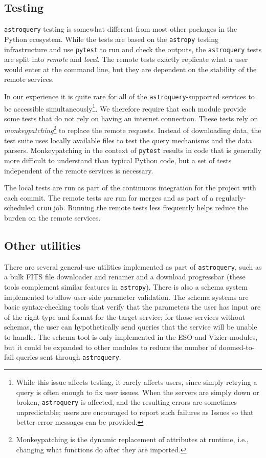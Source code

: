 \documentclass[twocolumn]{aastex62}
\newcommand{\package}[1]{\texttt{#1}\xspace}
\newcommand{\astroquery}{\package{astroquery}}
\newcommand{\astropypkg}{\package{astropy}}
\begin{document}
\subsection{Testing}
\astroquery testing is somewhat different from most other packages in the Python
ecosystem.  While the tests are based on the \astropypkg testing infrastructure and use
\package{pytest} to run and check the outputs, the \astroquery tests are split into
\emph{remote} and \emph{local}.  The remote tests exactly replicate what a user
would enter at the command line, but they are dependent on the stability of the
remote services.

In our experience it is quite rare for all of the \astroquery-supported
services to be accessible simultaneously\footnote{While this issue affects
testing, it rarely affects users, since simply retrying a query is often
enough to fix user issues.  When the servers are simply down or broken,
\astroquery is affected, and the resulting errors are sometimes unpredictable;
users are encouraged to report such failures as Issues so that better error
messages can be provided.}. We therefore require that each
module provide some tests that do not rely on having an internet connection.
These tests rely on \emph{monkeypatching}\footnote{Monkeypatching is the
  dynamic replacement of attributes at runtime, i.e., changing what
  functions do after they are imported.} to replace the remote
requests. Instead of downloading data, the test suite uses locally available
files to test the query mechanisms and the data parsers.  Monkeypatching in
the context of \package{pytest} results in code that is generally more
difficult to understand than typical Python code, but a set of tests
independent of the remote services is necessary.

The local tests are run as part of the continuous integration for the
project with each commit.  The remote tests are run for merges and as part of a
regularly-scheduled \texttt{cron} job.  Running the remote tests less frequently
helps reduce the burden on the remote services.

\subsection{Other utilities}
There are several general-use utilities implemented as part of \astroquery, such
as a bulk FITS file downloader and renamer and a download progressbar (these
tools complement similar features in \astropypkg).  There
is also a schema system implemented to allow user-side parameter validation.
The schema systems are basic syntax-checking tools that verify that the parameters
the user has input are of the right type and format for the target service;
for those services without schemas, the user can hypothetically send queries
that the service will be unable to handle.
The schema tool is only implemented in the ESO and Vizier modules, but it could
be expanded to other modules to reduce the number of doomed-to-fail queries
sent through \astroquery.
\end{document}
